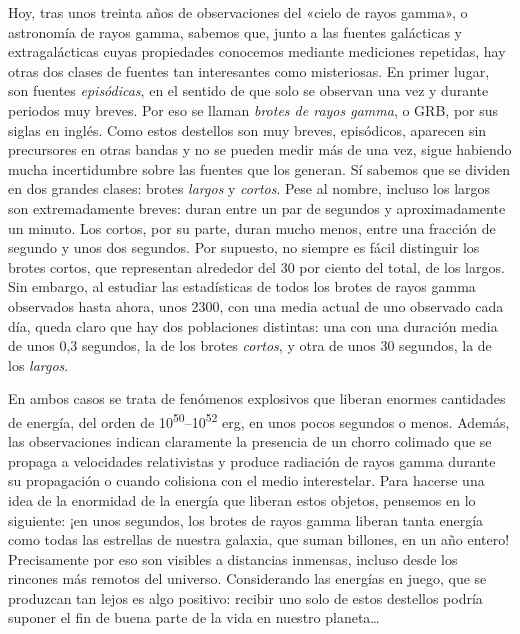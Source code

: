 Hoy, tras unos treinta años de observaciones del «cielo de rayos gamma», o astronomía de rayos gamma, sabemos que, junto a las fuentes galácticas y extragalácticas cuyas propiedades conocemos mediante mediciones repetidas, hay otras dos clases de fuentes tan interesantes como misteriosas. En primer lugar, son fuentes \emph{episódicas}, en el sentido de que solo se observan una vez y durante periodos muy breves. Por eso se llaman \emph{brotes de rayos gamma}, o GRB, por sus siglas en inglés. Como estos destellos son muy breves, episódicos, aparecen sin precursores en otras bandas y no se pueden medir más de una vez, sigue habiendo mucha incertidumbre sobre las fuentes que los generan. Sí sabemos que se dividen en dos grandes clases: brotes \emph{largos} y \emph{cortos}. Pese al nombre, incluso los largos son extremadamente breves: duran entre un par de segundos y aproximadamente un minuto. Los cortos, por su parte, duran mucho menos, entre una fracción de segundo y unos dos segundos. Por supuesto, no siempre es fácil distinguir los brotes cortos, que representan alrededor del 30 por ciento del total, de los largos. Sin embargo, al estudiar las estadísticas de todos los brotes de rayos gamma observados hasta ahora, unos 2300, con una media actual de uno observado cada día, queda claro que hay dos poblaciones distintas: una con una duración media de unos 0,3 segundos, la de los brotes \emph{cortos}, y otra de unos 30 segundos, la de los \emph{largos}.

En ambos casos se trata de fenómenos explosivos que liberan enormes cantidades de energía, del orden de 10\textsuperscript{50}--10\textsuperscript{52} erg, en unos pocos segundos o menos. Además, las observaciones indican claramente la presencia de un chorro colimado que se propaga a velocidades relativistas y produce radiación de rayos gamma durante su propagación o cuando colisiona con el medio interestelar. Para hacerse una idea de la enormidad de la energía que liberan estos objetos, pensemos en lo siguiente: ¡en unos segundos, los brotes de rayos gamma liberan tanta energía como todas las estrellas de nuestra galaxia, que suman billones, en un año entero! Precisamente por eso son visibles a distancias inmensas, incluso desde los rincones más remotos del universo. Considerando las energías en juego, que se produzcan tan lejos es algo positivo: recibir uno solo de estos destellos podría suponer el fin de buena parte de la vida en nuestro planeta\ldots{}

